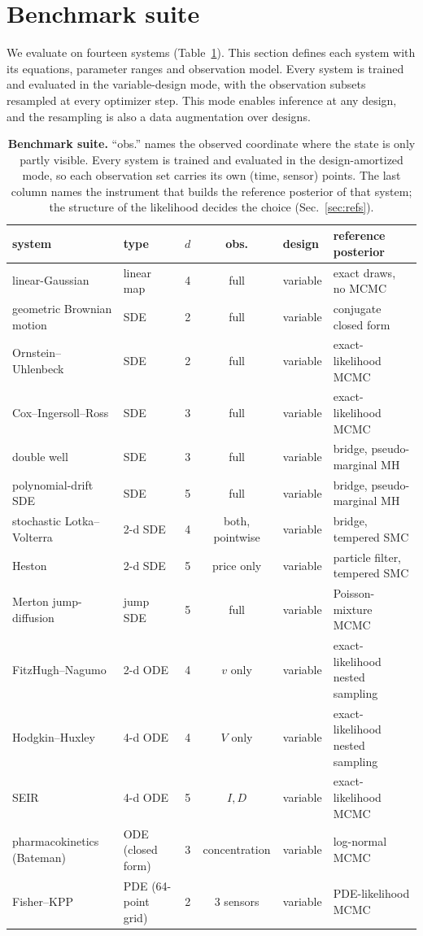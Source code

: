\documentclass[10pt]{article}
\begin{document}
\section{Benchmark suite}
\label{sec:suite}

We evaluate on fourteen systems (Table~\ref{tab:suite}). This section defines each system with its
equations, parameter ranges and observation model. Every system is trained and evaluated in the
variable-design mode, with the observation subsets resampled at every optimizer step. This mode
enables inference at any design, and the resampling is also a data augmentation over designs.

\begin{table}[t]
\centering
\small
\footnotesize
\setlength{\tabcolsep}{4pt}
\begin{tabular}{@{}llccll@{}}
\toprule
system & type & $d$ & obs. & design & reference posterior \\
\midrule
linear-Gaussian & linear map & 4 & full & variable & exact draws, no MCMC \\
geometric Brownian motion & SDE & 2 & full & variable & conjugate closed form \\
Ornstein--Uhlenbeck & SDE & 2 & full & variable & exact-likelihood MCMC \\
Cox--Ingersoll--Ross & SDE & 3 & full & variable & exact-likelihood MCMC \\
double well & SDE & 3 & full & variable & bridge, pseudo-marginal MH \\
polynomial-drift SDE & SDE & 5 & full & variable & bridge, pseudo-marginal MH \\
stochastic Lotka--Volterra & 2-d SDE & 4 & both, pointwise & variable & bridge, tempered SMC \\
Heston & 2-d SDE & 5 & price only & variable & particle filter, tempered SMC \\
Merton jump-diffusion & jump SDE & 5 & full & variable & Poisson-mixture MCMC \\
FitzHugh--Nagumo & 2-d ODE & 4 & $v$ only & variable & exact-likelihood nested sampling \\
Hodgkin--Huxley & 4-d ODE & 4 & $V$ only & variable & exact-likelihood nested sampling \\
SEIR & 4-d ODE & 5 & $I, D$ & variable & exact-likelihood MCMC \\
pharmacokinetics (Bateman) & ODE (closed form) & 3 & concentration & variable & log-normal MCMC \\
Fisher--KPP & PDE (64-point grid) & 2 & 3 sensors & variable & PDE-likelihood MCMC \\
\bottomrule
\end{tabular}
\caption{\textbf{Benchmark suite.} ``obs.'' names the observed coordinate where the state is only
partly visible. Every system is trained and evaluated in the design-amortized mode, so each
observation set carries its own (time, sensor) points. The last column names the instrument that
builds the reference posterior of that system; the structure of the likelihood decides the choice
(Sec.~\ref{sec:refs}).}
\label{tab:suite}
\end{table}
\end{document}

